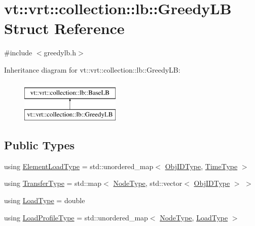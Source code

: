 \hypertarget{structvt_1_1vrt_1_1collection_1_1lb_1_1_greedy_l_b}{}\section{vt\+:\+:vrt\+:\+:collection\+:\+:lb\+:\+:Greedy\+LB Struct Reference}
\label{structvt_1_1vrt_1_1collection_1_1lb_1_1_greedy_l_b}


{\ttfamily \#include $<$greedylb.\+h$>$}

Inheritance diagram for vt\+:\+:vrt\+:\+:collection\+:\+:lb\+:\+:Greedy\+LB\+:\begin{figure}[H]
\begin{center}
\leavevmode
\includegraphics[height=2.000000cm]{structvt_1_1vrt_1_1collection_1_1lb_1_1_greedy_l_b}
\end{center}
\end{figure}
\subsection*{Public Types}
\begin{DoxyCompactItemize}
\item 
using \hyperlink{structvt_1_1vrt_1_1collection_1_1lb_1_1_greedy_l_b_af08e010a34268f2a299ce37dc428ea75}{Element\+Load\+Type} = std\+::unordered\+\_\+map$<$ \hyperlink{structvt_1_1vrt_1_1collection_1_1lb_1_1_base_l_b_a15a2f756b59c8c2437985206b32aa403}{Obj\+I\+D\+Type}, \hyperlink{namespacevt_a876a9d0cd5a952859c72de8a46881442}{Time\+Type} $>$
\item 
using \hyperlink{structvt_1_1vrt_1_1collection_1_1lb_1_1_greedy_l_b_af15e80ab3cfa9337647801dfa08fbf53}{Transfer\+Type} = std\+::map$<$ \hyperlink{namespacevt_a866da9d0efc19c0a1ce79e9e492f47e2}{Node\+Type}, std\+::vector$<$ \hyperlink{structvt_1_1vrt_1_1collection_1_1lb_1_1_base_l_b_a15a2f756b59c8c2437985206b32aa403}{Obj\+I\+D\+Type} $>$ $>$
\item 
using \hyperlink{structvt_1_1vrt_1_1collection_1_1lb_1_1_greedy_l_b_a7127421bb4c8c56482d07cb6e35ccc11}{Load\+Type} = double
\item 
using \hyperlink{structvt_1_1vrt_1_1collection_1_1lb_1_1_greedy_l_b_a3db2c9b36ac99ed4aed38519be4aad60}{Load\+Profile\+Type} = std\+::unordered\+\_\+map$<$ \hyperlink{namespacevt_a866da9d0efc19c0a1ce79e9e492f47e2}{Node\+Type}, \hyperlink{structvt_1_1vrt_1_1collection_1_1lb_1_1_base_l_b_a215e22b9f12678303f49615ae3be05cc}{Load\+Type} $>$
\end{DoxyCompactItemize}
